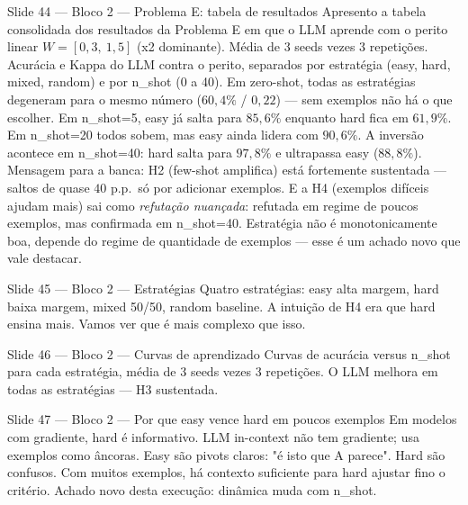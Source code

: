 \documentclass[aspectratio=169,10pt]{beamer}
\begin{document}
\begin{frame}{Slide 44 --- Bloco 2 --- Problema E: tabela de resultados}
\footnotesize
Apresento a tabela consolidada dos resultados da Problema E em que o LLM aprende com o perito linear $W=[0{,}3,\ 1{,}5]$ (x2 dominante). M\'edia de 3 seeds vezes 3 repeti\c{c}\~oes. Acur\'acia e Kappa do LLM contra o perito, separados por estrat\'egia (easy, hard, mixed, random) e por n\_shot (0 a 40). Em zero-shot, todas as estrat\'egias degeneram para o mesmo n\'umero ($60{,}4\%$ / $0{,}22$) --- sem exemplos n\~ao h\'a o que escolher. Em n\_shot=5, easy j\'a salta para $85{,}6\%$ enquanto hard fica em $61{,}9\%$. Em n\_shot=20 todos sobem, mas easy ainda lidera com $90{,}6\%$. A invers\~ao acontece em n\_shot=40: hard salta para $97{,}8\%$ e ultrapassa easy ($88{,}8\%$). Mensagem para a banca: H2 (few-shot amplifica) est\'a fortemente sustentada --- saltos de quase $40$ p.p.\ s\'o por adicionar exemplos. E a H4 (exemplos dif\'iceis ajudam mais) sai como \emph{refuta\c{c}\~ao nuan\c{c}ada}: refutada em regime de poucos exemplos, mas confirmada em n\_shot=40. Estrat\'egia n\~ao \'e monotonicamente boa, depende do regime de quantidade de exemplos --- esse \'e um achado novo que vale destacar.
\end{frame}

\begin{frame}{Slide 45 --- Bloco 2 --- Estrat\'egias}
\footnotesize
Quatro estrat\'egias: easy alta margem, hard baixa margem, mixed 50/50, random baseline. A intui\c{c}\~ao de H4 era que hard ensina mais. Vamos ver que \'e mais complexo que isso.
\end{frame}

\begin{frame}{Slide 46 --- Bloco 2 --- Curvas de aprendizado}
\footnotesize
Curvas de acur\'acia versus n\_shot para cada estrat\'egia, m\'edia de 3 seeds vezes 3 repeti\c{c}\~oes. O LLM melhora em todas as estrat\'egias --- H3 sustentada.
\end{frame}

\begin{frame}{Slide 47 --- Bloco 2 --- Por que easy vence hard em poucos exemplos}
\footnotesize
Em modelos com gradiente, hard \'e informativo. LLM in-context n\~ao tem gradiente; usa exemplos como \^ancoras. Easy s\~ao pivots claros: "\'e isto que A parece". Hard s\~ao confusos. Com muitos exemplos, h\'a contexto suficiente para hard ajustar fino o crit\'erio. Achado novo desta execu\c{c}\~ao: din\^amica muda com n\_shot.
\end{frame}
\end{document}
